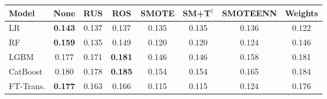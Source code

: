 \begin{tabular}{l c c c c c c c}
\toprule
Model & None & RUS & ROS & SMOTE & SM+T$^{\dagger}$ & SMOTEENN & Weights \\
\midrule
LR         & \textbf{0.143} & 0.137 & 0.137 & 0.135 & 0.135 & 0.136 & 0.122 \\
RF         & \textbf{0.159} & 0.135 & 0.149 & 0.120 & 0.120 & 0.124 & 0.146 \\
LGBM       & 0.177 & 0.171 & \textbf{0.181} & 0.146 & 0.146 & 0.158 & 0.181 \\
CatBoost   & 0.180 & 0.178 & \textbf{0.185} & 0.154 & 0.154 & 0.165 & 0.184 \\
FT-Trans.  & \textbf{0.177} & 0.163 & 0.166 & 0.115 & 0.115 & 0.124 & 0.176 \\
\bottomrule
\end{tabular}
